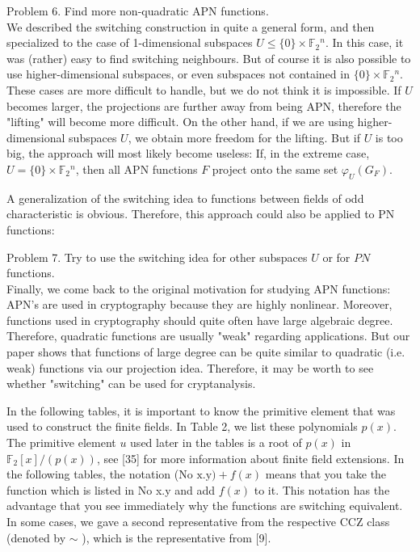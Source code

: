 \documentclass[10pt]{article}
\begin{document}
Problem 6. Find more non-quadratic APN functions.\\
We described the switching construction in quite a general form, and then specialized to the case of 1-dimensional subspaces $U \leq\{0\} \times \mathbb{F}_{2}{ }^{n}$. In this case, it was (rather) easy to find switching neighbours. But of course it is also possible to use higher-dimensional subspaces, or even subspaces not contained in $\{0\} \times \mathbb{F}_{2}{ }^{n}$. These cases are more difficult to handle, but we do not think it is impossible. If $U$ becomes larger, the projections are further away from being APN, therefore the "lifting" will become more difficult. On the other hand, if we are using higher-dimensional subspaces $U$, we obtain more freedom for the lifting. But if $U$ is too big, the approach will most likely become useless: If, in the extreme case, $U=\{0\} \times \mathbb{F}_{2}{ }^{n}$, then all APN functions $F$ project onto the same set $\varphi_{U}\left(G_{F}\right)$.

A generalization of the switching idea to functions between fields of odd characteristic is obvious. Therefore, this approach could also be applied to PN functions:

Problem 7. Try to use the switching idea for other subspaces $U$ or for $P N$ functions.\\
Finally, we come back to the original motivation for studying APN functions: APN's are used in cryptography because they are highly nonlinear. Moreover, functions used in cryptography should quite often have large algebraic degree. Therefore, quadratic functions are usually "weak" regarding applications. But our paper shows that functions of large degree can be quite similar to quadratic (i.e. weak) functions via our projection idea. Therefore, it may be worth to see whether "switching" can be used for cryptanalysis.

In the following tables, it is important to know the primitive element that was used to construct the finite fields. In Table 2, we list these polynomials $p(x)$. The primitive element $u$ used later in the tables is a root of $p(x)$ in $\mathbb{F}_{2}[x] /(p(x))$, see [35] for more information about finite field extensions. In the following tables, the notation (No $\mathrm{x} . \mathrm{y})+f(x)$ means that you take the function which is listed in No x.y and add $f(x)$ to it. This notation has the advantage that you see immediately why the functions are switching equivalent. In some cases, we gave a second representative from the respective CCZ class (denoted by $\sim$ ), which is the representative from [9].
\end{document}
